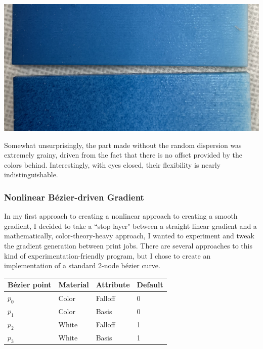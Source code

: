 \documentclass{article}
\begin{document}
\begin{multicols}{2}
\noindent
\includegraphics[width=\columnwidth]{grainy-vs-not-gradient}

\noindent
Somewhat unsurprisingly, the part made without the random dispersion was extremely grainy, driven from the fact that there is no offset provided by the colors behind. Interestingly, with eyes closed, their flexibility is nearly indistinguishable.

\subsubsection{Nonlinear B\'ezier-driven Gradient}

In my first approach to creating a nonlinear approach to creating a smooth gradient, I decided to take a ``stop layer" between a straight linear gradient and a mathematically, color-theory-heavy approach, I wanted to experiment and tweak the gradient generation between print jobs. There are several approaches to this kind of experimentation-friendly program, but I chose to create an implementation of a standard 2-node b\'ezier curve.
\\

\noindent
\begin{tabular}{|p{}||p{}|p{}|p{}|}
    \hline
    B\'ezier point & Material & Attribute & Default \\
    \hline
    $p_0$ & Color & Falloff & 0  \\
    $p_1$ & Color & Basis & 0  \\
    $p_2$ & White & Falloff & 1  \\
    $p_3$ & White & Basis & 1  \\
    \hline
\end{tabular}


\end{multicols}
\end{document}
